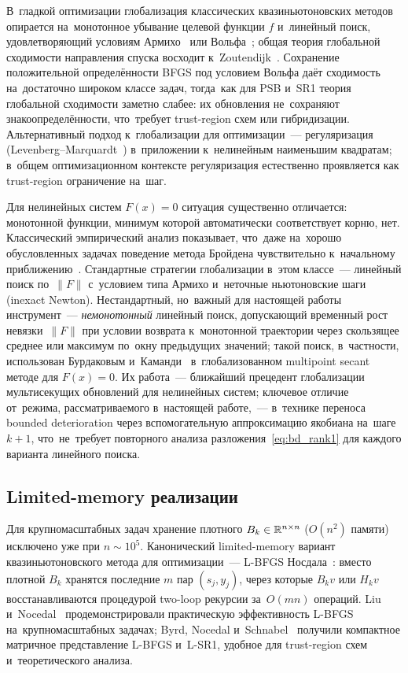 В~гладкой оптимизации глобализация классических квазиньютоновских
методов опирается на~монотонное убывание целевой функции $f$ и~линейный
поиск, удовлетворяющий условиям Армихо~\cite{armijo1966} или
Вольфа~\cite{wolfe1969}; общая теория глобальной сходимости
направления спуска восходит к~Zoutendijk~\cite{zoutendijk1970}.
Сохранение положительной определённости BFGS под условием Вольфа даёт
сходимость на~достаточно широком классе задач, тогда~как
для PSB и~SR1 теория глобальной сходимости заметно слабее: их обновления
не~сохраняют знакоопределённости, что~требует trust-region схем
или гибридизации. Альтернативный подход к~глобализации для
оптимизации~--- регуляризация (Levenberg--Marquardt~\cite{marquardt1963})
в~приложении к~нелинейным наименьшим квадратам; в~общем оптимизационном
контексте регуляризация естественно проявляется как trust-region
ограничение на~шаг.

Для нелинейных систем $F(x)=0$ ситуация существенно отличается:
монотонной функции, минимум которой автоматически соответствует
корню, нет. Классический эмпирический
анализ показывает, что~даже на~хорошо обусловленных задачах
поведение метода Бройдена чувствительно к~начальному
приближению~\cite{shannophua1978,more1981}. Стандартные стратегии
глобализации в~этом классе~--- линейный поиск по~$\|F\|$ с~условием
типа Армихо и~неточные ньютоновские шаги (inexact Newton).
Нестандартный, но~важный для настоящей работы инструмент~---
\emph{немонотонный} линейный поиск, допускающий временный рост
невязки~$\|F\|$ при условии возврата к~монотонной траектории через
скользящее среднее или максимум по~окну предыдущих значений; такой
поиск, в~частности, использован Бурдаковым и~Каманди~\cite{burdakov2018}
в~глобализованном multipoint secant методе для $F(x)=0$. Их работа~---
ближайший прецедент глобализации мультисекущих обновлений для
нелинейных систем; ключевое отличие от~режима, рассматриваемого
в~настоящей работе,~--- в~технике переноса bounded deterioration
через вспомогательную аппроксимацию якобиана на~шаге $k+1$,
что~не~требует повторного анализа разложения~\eqref{eq:bd_rank1}
для каждого варианта линейного поиска.

\subsection{Limited-memory реализации}

Для крупномасштабных задач хранение плотного $B_k\in\mathbb{R}^{n\times n}$
($O(n^2)$ памяти) исключено уже при $n\sim 10^5$. Канонический
limited-memory вариант квазиньютоновского метода для оптимизации~---
L-BFGS Носдала~\cite{lbfgs}: вместо плотной $B_k$ хранятся
последние $m$ пар $(s_j, y_j)$, через которые $B_k v$ или $H_k v$
восстанавливаются процедурой two-loop рекурсии за~$O(mn)$ операций.
Liu и~Nocedal~\cite{liu1989} продемонстрировали практическую
эффективность L-BFGS на~крупномасштабных задачах; Byrd, Nocedal
и~Schnabel~\cite{byrd1994} получили компактное матричное
представление L-BFGS и~L-SR1, удобное для trust-region схем
и~теоретического анализа.

